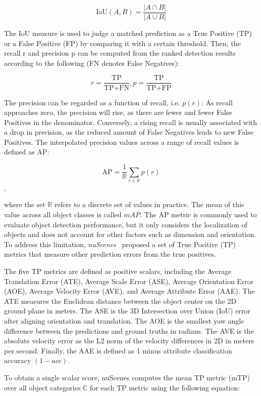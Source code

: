 \[
\text{IoU}(A,B) = \frac{|A \cap B|}{|A \cup B|}
\]

The IoU measure is used to judge a matched prediction as a True Positive (TP) or a False Positive (FP) by comparing it with a certain threshold.
Then, the recall r and precision p can be computed from the ranked detection results according to the following (FN denotes False Negatives):

\[
    r = \frac{\text{TP}}{\text{TP}+\text{FN}}, p = \frac{\text{TP}}{\text{TP}+\text{FP}}
\]

The precision can be regarded as a function of recall, i.e. $p(r)$: As recall approaches zero, the precision will rise, as there are fewer and fewer False Positives in the denominator.
Conversely, a rising recall is usually associated with a drop in precision, as the reduced amount of False Negatives leads to new False Positives.
The interpolated precision values across a range of recall values is defined as AP:

\[
    \text{AP} = \frac{1}{\mathbb{R}} \sum_{r \in \mathbb{R}} p(r)
\],

where the set $\mathbb{R}$ refers to a discrete set of values in practice.
The mean of this value across all object classes is called $mAP$.
The AP metric is commonly used to evaluate object detection performance, but it only considers the localization of objects and does not account for other factors such as dimension and orientation.
To address this limitation, \textit{nuScenes}~\cite{caesar2020nuscenes} proposed a set of True Positive (TP) metrics that measure other prediction errors from the true positives.

The five TP metrics are defined as positive scalars, including the Average Translation Error (ATE), Average Scale Error (ASE), Average Orientation Error (AOE), Average Velocity Error (AVE), and Average Attribute Error (AAE). The ATE measures the Euclidean distance between the object center on the 2D ground plane in meters.
The ASE is the 3D Intersection over Union (IoU) error after aligning orientation and translation.
The AOE is the smallest yaw angle difference between the predictions and ground truths in radians.
The AVE is the absolute velocity error as the L2 norm of the velocity differences in 2D in meters per second.
Finally, the AAE is defined as 1 minus attribute classification accuracy $(1-acc)$.

To obtain a single scalar score, nuScenes computes the mean TP metric (mTP) over all object categories $\mathbb{C}$ for each TP metric using the following equation:

